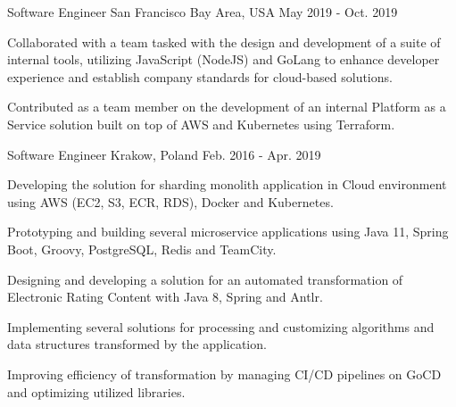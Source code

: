 \begin{cventries}
  \cventry
    {Software Engineer} %
    {} %
    {San Francisco Bay Area, USA} %
    {May 2019 - Oct. 2019} %
    {
      \begin{cvitems} %
        \item {Collaborated with a team tasked with the design and development of a suite of internal tools, utilizing JavaScript (NodeJS) and GoLang to enhance developer experience and establish company standards for cloud-based solutions.}
        \item {Contributed as a team member on the development of an internal Platform as a Service solution built on top of AWS and Kubernetes using Terraform. }
      \end{cvitems}
    }

  \cventry
    {Software Engineer} %
    { } %
    {Krakow, Poland} %
    {Feb. 2016 - Apr. 2019} %
    {
      \begin{cvitems} %
        \item {Developing the solution for sharding monolith application in Cloud environment using AWS (EC2, S3, ECR, RDS), Docker and Kubernetes.}
        \item {Prototyping and building several microservice applications using Java 11, Spring Boot, Groovy, PostgreSQL, Redis and TeamCity.}
        \item {Designing and developing a solution for an automated transformation of Electronic Rating Content with Java 8, Spring and Antlr.}
        \item {Implementing several solutions for processing and customizing algorithms and data structures transformed by the application.}
        \item {Improving efficiency of transformation by managing CI/CD pipelines on GoCD and optimizing utilized libraries.}
      \end{cvitems}
    }


\end{cventries}
